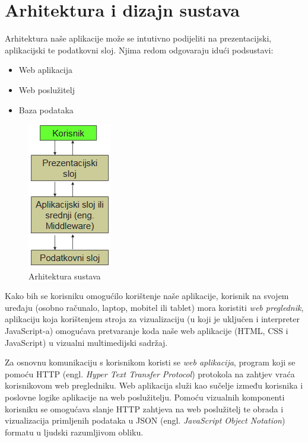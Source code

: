 \chapter{Arhitektura i dizajn sustava}
	
		Arhitektura naše aplikacije može se intutivno podijeliti na prezentacijski, aplikacijski te podatkovni sloj. Njima redom odgovaraju idući podsustavi:
		\begin{itemize}
			\item 	Web aplikacija
			\item 	Web poslužitelj
			\item 	Baza podataka		
		\end{itemize}

		\begin{figure}[H]
			\includegraphics[scale=0.6]{slike/ArhitekturniPodsustavi.PNG}
			\centering
			\caption{Arhitektura sustava}
			\label{fig:arhitekturni_podsustavi}
		\end{figure}

		Kako bih se korisniku omogućilo korištenje naše aplikacije, korisnik na svojem uređaju (osobno računalo, laptop, mobitel ili tablet) mora koristiti \textit{web preglednik}, aplikaciju koja korištenjem stroja za vizualizaciju (u koji je uključen i interpreter JavaScript-a) omogućava
		pretvaranje koda naše web aplikacije (HTML, CSS i JavaScript) u vizualni multimedijski sadržaj.

		Za osnovnu komunikaciju s korisnikom koristi se \textit{web aplikacija}, program koji se pomoću HTTP (engl. \textit{Hyper Text Transfer Protocol}) protokola na zahtjev vraća korisnikovom web pregledniku. Web aplikacija služi kao sučelje između korisnika i poslovne logike aplikacije
		na web poslužitelju. Pomoću vizualnih komponenti korisniku se omogućava slanje HTTP zahtjeva na web poslužitelj te obrada i vizualizacija primljenih podataka u JSON (engl. \textit{JavaScript Object Notation}) formatu u ljudski razumljivom obliku.

